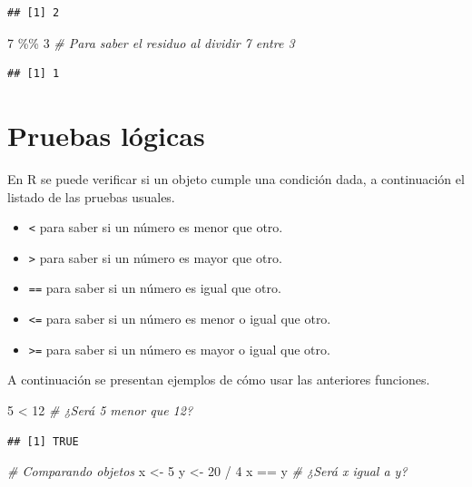 \documentclass[
]{book}
\makeatletter
\newenvironment{Shaded}{\begin{snugshade}}{\end{snugshade}}
\newcommand{\CommentTok}[1]{\textcolor[rgb]{0.56,0.35,0.01}{\textit{#1}}}
\newcommand{\DecValTok}[1]{\textcolor[rgb]{0.00,0.00,0.81}{#1}}
\newcommand{\NormalTok}[1]{#1}
\newcommand{\OtherTok}[1]{\textcolor[rgb]{0.56,0.35,0.01}{#1}}
\newcommand{\SpecialCharTok}[1]{\textcolor[rgb]{0.00,0.00,0.00}{#1}}
\providecommand{\tightlist}{%
  \setlength{\itemsep}{0pt}\setlength{\parskip}{0pt}}
\newenvironment{kframe}{%
\medskip{}
\setlength{\fboxsep}{.8em}
 \def\at@end@of@kframe{}%
 \ifinner\ifhmode%
  \def\at@end@of@kframe{\end{minipage}}%
  \begin{minipage}{\columnwidth}%
 \fi\fi%
 \def\FrameCommand##1{\hskip\@totalleftmargin \hskip-\fboxsep
 \colorbox{shadecolor}{##1}\hskip-\fboxsep
     \hskip-\linewidth \hskip-\@totalleftmargin \hskip\columnwidth}%
 \MakeFramed {\advance\hsize-\width
   \@totalleftmargin\z@ \linewidth\hsize
   \@setminipage}}%
 {\par\unskip\endMakeFramed%
 \at@end@of@kframe}
\renewenvironment{Shaded}{\begin{kframe}}{\end{kframe}}
\makeatother
\begin{document}
\begin{verbatim}
## [1] 2
\end{verbatim}

\begin{Shaded}
\begin{Highlighting}[]
\DecValTok{7} \SpecialCharTok{\%\%} \DecValTok{3}  \CommentTok{\# Para saber el residuo al dividir 7 entre 3}
\end{Highlighting}
\end{Shaded}

\begin{verbatim}
## [1] 1
\end{verbatim}

\hypertarget{pruebas-luxf3gicas}{%
\section{Pruebas lógicas}\label{pruebas-luxf3gicas}}

En R se puede verificar si un objeto cumple una condición dada, a continuación el listado de las pruebas usuales.

\begin{itemize}
\tightlist
\item
  \texttt{\textless{}} para saber si un número es menor que otro.
\item
  \texttt{\textgreater{}} para saber si un número es mayor que otro.
\item
  \texttt{==} para saber si un número es igual que otro.
\item
  \texttt{\textless{}=} para saber si un número es menor o igual que otro.
\item
  \texttt{\textgreater{}=} para saber si un número es mayor o igual que otro.
\end{itemize}

A continuación se presentan ejemplos de cómo usar las anteriores funciones.

\begin{Shaded}
\begin{Highlighting}[]
\DecValTok{5} \SpecialCharTok{\textless{}} \DecValTok{12}  \CommentTok{\# ¿Será 5 menor que 12?}
\end{Highlighting}
\end{Shaded}

\begin{verbatim}
## [1] TRUE
\end{verbatim}

\begin{Shaded}
\begin{Highlighting}[]
\CommentTok{\# Comparando objetos}
\NormalTok{x }\OtherTok{\textless{}{-}} \DecValTok{5}
\NormalTok{y }\OtherTok{\textless{}{-}} \DecValTok{20} \SpecialCharTok{/} \DecValTok{4}
\NormalTok{x }\SpecialCharTok{==}\NormalTok{ y  }\CommentTok{\# ¿Será x igual a y?}
\end{Highlighting}
\end{Shaded}
\end{document}

